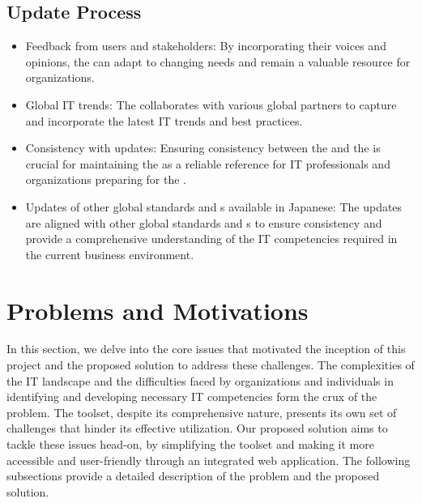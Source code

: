 \subsection{ Update Process}

\begin{itemize}
    \item Feedback from users and stakeholders: By incorporating their voices and opinions, the  can adapt to changing needs and remain a valuable resource for organizations.
    \item Global IT trends: The  collaborates with various global partners to capture and incorporate the latest IT trends and best practices.
    \item Consistency with  updates: Ensuring consistency between the  and the  is crucial for maintaining the  as a reliable reference for IT professionals and organizations preparing for the .
    \item Updates of other global standards and s available in Japanese: The  updates are aligned with other global standards and s to ensure consistency and provide a comprehensive understanding of the IT competencies required in the current business environment.
\end{itemize}



\newpage
\section{Problems and Motivations}
In this section, we delve into the core issues that motivated the inception of this project and the proposed solution to address these challenges. The complexities of the IT landscape and the difficulties faced by organizations and individuals in identifying and developing necessary IT competencies form the crux of the problem. The  toolset, despite its comprehensive nature, presents its own set of challenges that hinder its effective utilization. Our proposed solution aims to tackle these issues head-on, by simplifying the  toolset and making it more accessible and user-friendly through an integrated web application. The following subsections provide a detailed description of the problem and the proposed solution.

